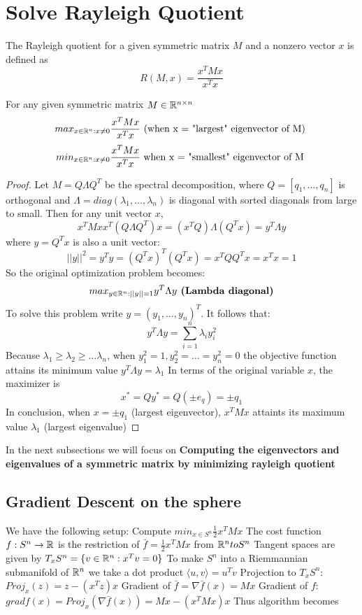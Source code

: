 \documentclass[11pt,a4paper]{report}
\begin{document}
\chapter{Solve Rayleigh Quotient}\label{RayChapter}
The Rayleigh quotient for a given symmetric matrix $M$ and a nonzero vector $x$ is defined as
$$ R(M,x) = \frac{x^T M x}{x^T x}$$
\begin{thm}
    For any given symmetric matrix $M \in \mathbb{R}^{n \times n}$
    $$ max_{x \in \mathbb{R}^{n}: x \neq 0} \frac{x^T M x}{x^T x} \text{ (when x = "largest" eigenvector of M) } $$
    $$ min_{x \in \mathbb{R}^{n}: x \neq 0} \frac{x^T M x}{x^T x} \text{ when x = "smallest" eigenvector of M } $$
    \begin{proof}        
        Let $M = Q \Lambda Q^T$ be the spectral decomposition, where $Q = [q_1, \dots, q_n]$ is orthogonal and 
        $\Lambda = diag(\lambda_1, \dots, \lambda_n) $ is diagonal with sorted diagonals from large to small.
        Then for any unit vector $x$,
        $$ x^T M x x^T (Q \Lambda Q^T) x = (x^T Q) \Lambda (Q^T x) = y^T \Lambda y $$
        where $y = Q^Tx$ is also a unit vector:
        $$ || y ||^2 = y^T y = (Q^T x)^T (Q^T x) = x^T Q Q^T x = x^T x = 1 $$
        So the original optimization problem becomes:
        $$ max_{y \in \mathbb{R}^n : || y || =1 } y^T \Lambda y \textbf{ (Lambda diagonal)}  $$
        To solve this problem write $y = (y_1, \dots, y_n)^T$. It follows that:
        $$ y^T \Lambda y = \sum_{i=1}^{n} \lambda_i y_i^2  $$
        Because $\lambda_1 \geq \lambda_2 \geq \dots \lambda_n$, when
        $y_1^2 = 1, y_2^2 = \dots = y_n^2 = 0$
        the objective function attains its minimum value $y^T \Lambda y = \lambda_1$
        In terms of the original variable $x$, the maximizer is
        $$ x^{*} = Qy^{*} = Q (\pm e_q) = \pm q_1 $$
        In conclusion, when $x=\pm q_1$ (largest eigenvector), $x^TMx$ attaints its maximum value $\lambda_1$ (largest eigenvalue)
    \end{proof}
\end{thm}
In the next subsections we will focus on \textbf{Computing the eigenvectors and eigenvalues of a symmetric matrix by minimizing rayleigh quotient}
\section{Gradient Descent on the sphere}
We have the following setup: \newline
Compute $ min_{x \in S^n} \frac{1}{2} x^T M x $ \newline
The cost function $f: S^n \to \mathbb{R}$ is the restriction of $\bar{f} = \frac{1}{2} x^T M x $ from $\mathbb{R}^n to S^n$ \newline 
Tangent spaces are given by $T_x S^n = \{ v \in \mathbb{R}^n : x^T v = 0 \}$ \newline
To make $S^n$ into a Riemmannian submanifold of $\mathbb{R}^n$ we take a dot product $\langle u, v \rangle = u^T v $ 
Projection to $T_x S^n$: $Proj_x(z) = z - (x^T z)x$ \newline
Gradient of $\bar{f} = \nabla \bar{f} (x) = M x$ \newline
Gradient of $f$: $grad f(x) = Proj_x(\nabla \bar{f} (x)) = Mx - (x^T M x) x$
Thus algorithm becomes
\end{document}
